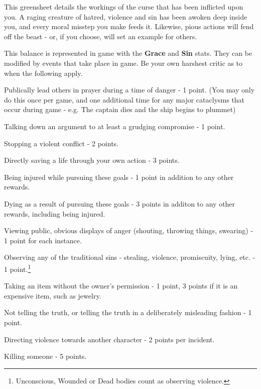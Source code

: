 \documentclass[green]{airship}
\begin{document}
\name{\gWolf{}}

This greensheet details the workings of the curse that has been inflicted upon you. A raging creature of hatred, violence and sin has been awoken deep inside you, and every moral misstep you make feeds it. Likewise, pious actions will fend off the beast - or, if you choose, will set an example for others.

This balance is represented in game with the {\bf Grace} and {\bf Sin} stats. They can be modified by events that take place in game. Be your own harshest critic as to when the following apply.

\begin{enum}[Grace]

\item Publically lead others in prayer during a time of danger - 1 point. (You may only do this once per game, and one additional time for any major cataclysms that occur during game - e.g. The captain dies and the ship begins to plummet)

\item Talking down an argument to at least a grudging compromise - 1 point.

\item Stopping a violent conflict - 2 points.

\item Directly saving a life through your own action - 3 points.

\item Being injured while pursuing these goals - 1 point in addition to any other rewards.

\item Dying as a result of pursuing these goals - 3 points in additon to any other rewards, including being injured.
\end{enum}

\begin{enum}[Sin]

\item Viewing public, obvious displays of anger (shouting, throwing things, swearing) - 1 point for each instance. 

\item Observing any of the traditional sins - stealing, violence, promiscuity, lying, etc. - 1 point.\footnote{Unconscious, Wounded or Dead bodies count as observing violence.}

\item Taking an item without the owner's permission - 1 point, 3 points if it is an expensive item, such as jewelry.

\item Not telling the truth, or telling the truth in a deliberately misleading fashion - 1 point.

\item Directing violence towards another character - 2 points per incident.

\item Killing someone - 5 points.
\end{enum}
\end{document}
